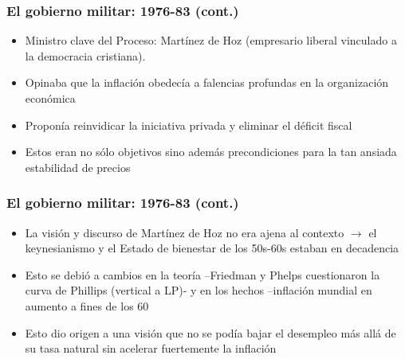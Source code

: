 \documentclass[14pt,aspectratio=169]{beamer}
\begin{document}
                \begin{frame}\frametitle{El gobierno militar: 1976-83 (cont.)}
                 \begin{itemize}\itemsep 5pt \medskip
                 \item Ministro clave del Proceso: Martínez de Hoz
                   (empresario liberal vinculado a la democracia
                   cristiana).
                   \item Opinaba que la inflación obedecía a falencias
                     profundas en la organización económica
                     \item Proponía reinvidicar la iniciativa privada
                       y eliminar el déficit fiscal
                       \item Estos eran no sólo objetivos sino además
                         precondiciones para la tan ansiada
                         estabilidad de precios
                 \end{itemize}
               \end{frame}


  \begin{frame}\frametitle{El gobierno militar: 1976-83 (cont.)}
                 \begin{itemize}\itemsep 5pt \medskip
                 \item La visión y discurso de Martínez de Hoz no era
                   ajena al contexto $\longrightarrow$ el
                   keynesianismo y el Estado de bienestar de los
                   50s-60s estaban en decadencia
                   \item Esto se debió a cambios en la teoría
                     --Friedman y Phelps cuestionaron la curva de
                     Phillips (vertical a LP)- y en los
                     hechos --inflación mundial en aumento a fines de
                     los 60
                     \item Esto dio origen a una visión que no se
                       podía bajar el desempleo más allá de su tasa
                       natural sin acelerar fuertemente la inflación
                 \end{itemize}
               \end{frame}
\end{document}
